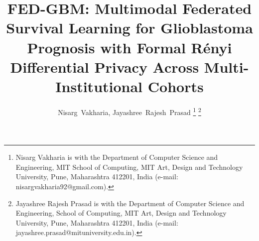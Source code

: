 \documentclass[journal,10pt,twocolumn]{IEEEtran}
\begin{document}
\title{FED-GBM: Multimodal Federated Survival Learning for Glioblastoma Prognosis with Formal R\'enyi Differential Privacy Across Multi-Institutional Cohorts}

\author{Nisarg~Vakharia,
        Jayashree~Rajesh~Prasad%
\thanks{Nisarg Vakharia is with the Department of Computer Science and Engineering, MIT School of Computing, MIT Art, Design and Technology University, Pune, Maharashtra 412201, India (e-mail: nisargvakharia92@gmail.com).}%
\thanks{Jayashree Rajesh Prasad is with the Department of Computer Science and Engineering, School of Computing, MIT Art, Design and Technology University, Pune, Maharashtra 412201, India (e-mail: jayashree.prasad@mituniversity.edu.in).}}

\maketitle
\end{document}
